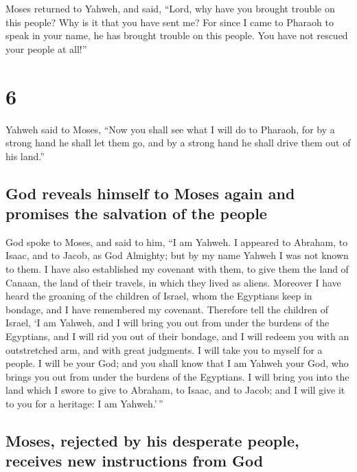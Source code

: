  Moses returned to Yahweh, and said, ``Lord, why have you
brought trouble on this people? Why is it that you have sent me?
 For since I came to Pharaoh to speak in your name, he
has brought trouble on this people. You have not rescued your people at
all!''

\hypertarget{section-5}{%
\section{6}\label{section-5}}

 Yahweh said to Moses, ``Now you shall see what I will do
to Pharaoh, for by a strong hand he shall let them go, and by a strong
hand he shall drive them out of his land.''

\hypertarget{god-reveals-himself-to-moses-again-and-promises-the-salvation-of-the-people}{%
\subsection{God reveals himself to Moses again and promises the
salvation of the
people}\label{god-reveals-himself-to-moses-again-and-promises-the-salvation-of-the-people}}

 God spoke to Moses, and said to him, ``I am Yahweh.
 I appeared to Abraham, to Isaac, and to Jacob, as God
Almighty; but by my name Yahweh I was not known to them. 
I have also established my covenant with them, to give them the land of
Canaan, the land of their travels, in which they lived as aliens.
 Moreover I have heard the groaning of the children of
Israel, whom the Egyptians keep in bondage, and I have remembered my
covenant.  Therefore tell the children of Israel, `I am
Yahweh, and I will bring you out from under the burdens of the
Egyptians, and I will rid you out of their bondage, and I will redeem
you with an outstretched arm, and with great judgments.  I
will take you to myself for a people. I will be your God; and you shall
know that I am Yahweh your God, who brings you out from under the
burdens of the Egyptians.  I will bring you into the land
which I swore to give to Abraham, to Isaac, and to Jacob; and I will
give it to you for a heritage: I am Yahweh.'\,''

\hypertarget{moses-rejected-by-his-desperate-people-receives-new-instructions-from-god}{%
\subsection{Moses, rejected by his desperate people, receives new
instructions from
God}\label{moses-rejected-by-his-desperate-people-receives-new-instructions-from-god}}

